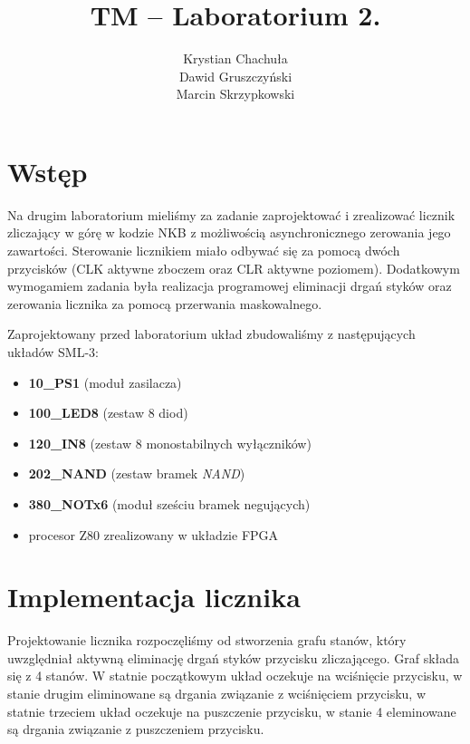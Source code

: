 \documentclass[fleqn]{article}
\title{TM -- Laboratorium 2.}
\author{Krystian Chachuła \\ Dawid Gruszczyński \\ Marcin Skrzypkowski}
\begin{document}
\maketitle

\setcounter{page}{0}
\thispagestyle{empty}

\pagebreak

\setcounter{page}{1}

\section{Wstęp}

Na drugim laboratorium mieliśmy za zadanie zaprojektować i zrealizować licznik zliczający w górę w kodzie NKB z możliwością asynchronicznego zerowania jego zawartości.
Sterowanie licznikiem miało odbywać się za pomocą dwóch przycisków (CLK aktywne zboczem oraz CLR aktywne poziomem).
Dodatkowym wymogamiem zadania była realizacja programowej eliminacji drgań styków oraz zerowania licznika za pomocą przerwania maskowalnego.

Zaprojektowany przed laboratorium układ zbudowaliśmy z następujących układów SML-3:

\begin{itemize}
	\item \textbf{10\_PS1} (moduł zasilacza)
	\item \textbf{100\_LED8} (zestaw 8 diod)
	\item \textbf{120\_IN8} (zestaw 8 monostabilnych wyłączników)
	\item \textbf{202\_NAND} (zestaw bramek \textit{NAND})
	\item \textbf{380\_NOTx6} (moduł sześciu bramek negujących)
	\item procesor Z80 zrealizowany w układzie FPGA
\end{itemize}

\section{Implementacja licznika}

Projektowanie licznika rozpoczęliśmy od stworzenia grafu stanów, który uwzględniał aktywną eliminację drgań styków przycisku zliczającego.
Graf składa się z 4 stanów. W statnie początkowym układ oczekuje na wciśnięcie przycisku, w stanie drugim eliminowane są drgania związanie z wciśnięciem przycisku, w statnie trzeciem układ oczekuje na puszczenie przycisku, w stanie 4 eleminowane są drgania związanie z puszczeniem przycisku.
\end{document}
